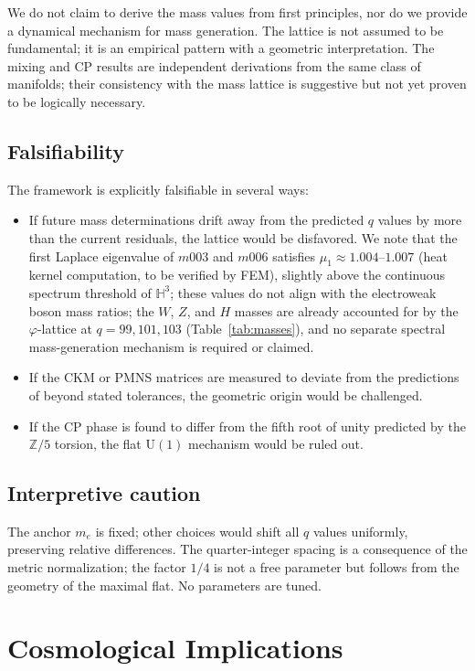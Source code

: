 ﻿\documentclass[12pt]{article}
\theoremstyle{definition}
\begin{document}
We do not claim to derive the mass values from first principles, nor do we provide a dynamical mechanism for mass generation. The lattice is not assumed to be fundamental; it is an empirical pattern with a geometric interpretation. The mixing and CP results are independent derivations from the same class of manifolds; their consistency with the mass lattice is suggestive but not yet proven to be logically necessary.

\subsection{Falsifiability}
The framework is explicitly falsifiable in several ways:
\begin{itemize}
\item If future mass determinations drift away from the predicted $q$ values by more than the current residuals, the lattice would be disfavored. We note that the first Laplace eigenvalue of $m003$ and $m006$ satisfies $\mu_1 \approx 1.004$--$1.007$ (heat kernel computation, to be verified by FEM), slightly above the continuous spectrum threshold of $\mathbb{H}^3$; these values do not align with the electroweak boson mass ratios; the $W$, $Z$, and $H$ masses are already accounted for by the $\varphi$-lattice at $q=99,101,103$ (Table~\ref{tab:masses}), and no separate spectral mass-generation mechanism is required or claimed.
\item If the CKM or PMNS matrices are measured to deviate from the predictions of \cite{Gentry:CKM,Gentry:PMNS} beyond stated tolerances, the geometric origin would be challenged.
\item If the CP phase is found to differ from the fifth root of unity predicted by the $\mathbb{Z}/5$ torsion, the flat $\mathrm{U}(1)$ mechanism would be ruled out.
\end{itemize}

\subsection{Interpretive caution}
The anchor $m_e$ is fixed; other choices would shift all $q$ values uniformly, preserving relative differences. The quarter-integer spacing is a consequence of the metric normalization; the factor $1/4$ is not a free parameter but follows from the geometry of the maximal flat. No parameters are tuned.

\section{Cosmological Implications}
\label{sec:cosmology}
\end{document}
